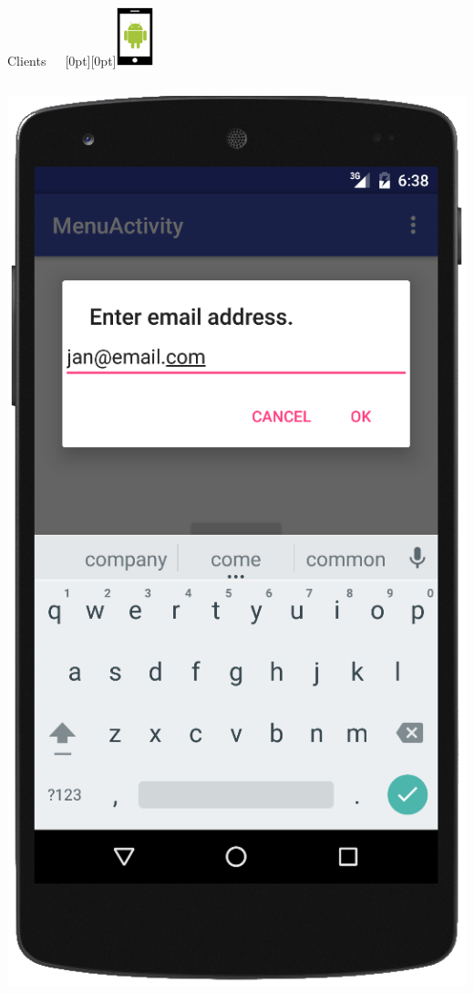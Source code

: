 \documentclass[11pt]{beamer}
\begin{document}
\begin{frame}{Clients~~~\raisebox{-10pt}[0pt][0pt]{\includegraphics[width=0.08\textwidth]{tech-stack-android}}}
\begin{columns}[T]
\begin{column}{.4\textwidth}
	\includegraphics[scale=0.27]{android_add_friend}
	\end{column}
\end{columns}
\end{frame}
\end{document}
